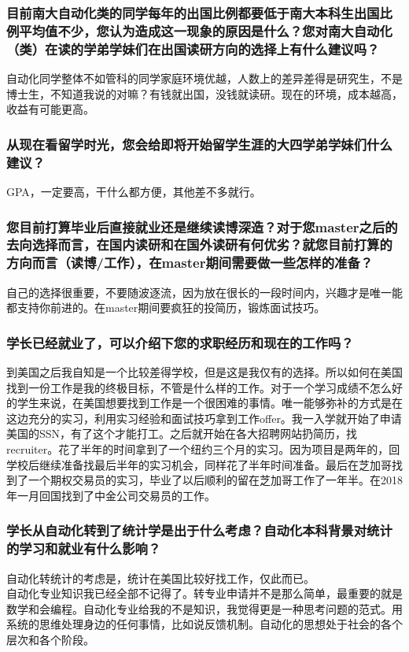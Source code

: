 \documentclass[a4paper,UTF8]{book}
\begin{document}
    \subsubsection*{目前南大自动化类的同学每年的出国比例都要低于南大本科生出国比例平均值不少，您认为造成这一现象的原因是什么？您对南大自动化（类）在读的学弟学妹们在出国读研方向的选择上有什么建议吗？}
    自动化同学整体不如管科的同学家庭环境优越，人数上的差异差得是研究生，不是博士生，不知道我说的对嘛？有钱就出国，没钱就读研。现在的环境，成本越高，收益有可能更高。

    \subsubsection*{从现在看留学时光，您会给即将开始留学生涯的大四学弟学妹们什么建议？}
    GPA，一定要高，干什么都方便，其他差不多就行。

    \subsubsection*{您目前打算毕业后直接就业还是继续读博深造？对于您master之后的去向选择而言，在国内读研和在国外读研有何优劣？就您目前打算的方向而言（读博/工作），在master期间需要做一些怎样的准备？}
    自己的选择很重要，不要随波逐流，因为放在很长的一段时间内，兴趣才是唯一能都支持你前进的。在master期间要疯狂的投简历，锻炼面试技巧。

    \subsubsection*{学长已经就业了，可以介绍下您的求职经历和现在的工作吗？}
    到美国之后我自知是一个比较差得学校，但是这是我仅有的选择。所以如何在美国找到一份工作是我的终极目标，不管是什么样的工作。对于一个学习成绩不怎么好的学生来说，在美国想要找到工作是一个很困难的事情。唯一能够弥补的方式是在这边充分的实习，利用实习经验和面试技巧拿到工作offer。我一入学就开始了申请美国的SSN，有了这个才能打工。之后就开始在各大招聘网站扔简历，找recruiter。花了半年的时间拿到了一个纽约三个月的实习。因为项目是两年的，回学校后继续准备找最后半年的实习机会，同样花了半年时间准备。最后在芝加哥找到了一个期权交易员的实习，毕业了以后顺利的留在芝加哥工作了一年半。在2018年一月回国找到了中金公司交易员的工作。

    \subsubsection*{学长从自动化转到了统计学是出于什么考虑？自动化本科背景对统计的学习和就业有什么影响？}
    自动化转统计的考虑是，统计在美国比较好找工作，仅此而已。\\
    自动化专业知识我已经全部不记得了。转专业申请并不是那么简单，最重要的就是数学和会编程。自动化专业给我的不是知识，我觉得更是一种思考问题的范式。用系统的思维处理身边的任何事情，比如说反馈机制。自动化的思想处于社会的各个层次和各个阶段。
    
\end{document}
